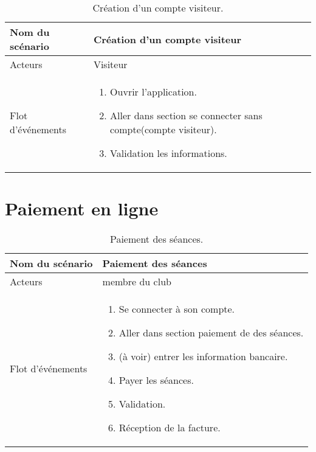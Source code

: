 \documentclass{report}
\begin{document}
\begin{table}[htbp]
\begin{center}
\begin{tabular}{|L{4cm}||L{10cm}|}
\hline Nom du scénario & Création d'un compte visiteur  \\
\hline  Acteurs &  Visiteur \\
\hline  Flot d'événements &  \begin{enumerate}
\item Ouvrir l'application.
\item Aller dans section se connecter sans compte(compte visiteur).
\item Validation les informations.
\end{enumerate} \\
\hline
\end{tabular}
\caption{Création d'un compte visiteur.\label{creavisit}}
\end{center}
\end{table}

\section{Paiement en ligne}
\begin{table}[htbp]
\begin{center}
\begin{tabular}{|L{4cm}||L{10cm}|}
\hline Nom du scénario & Paiement des séances \\
\hline  Acteurs &  membre du club \\
\hline  Flot d'événements &  \begin{enumerate}
\item Se connecter à son compte.
\item Aller dans section paiement de des séances.
\item (à voir) entrer les information bancaire.
\item Payer les séances.
\item Validation.
\item Réception de la facture.
\end{enumerate} \\
\hline
\end{tabular}
\caption{Paiement des séances.\label{paiement}}
\end{center}
\end{table}
\end{document}

